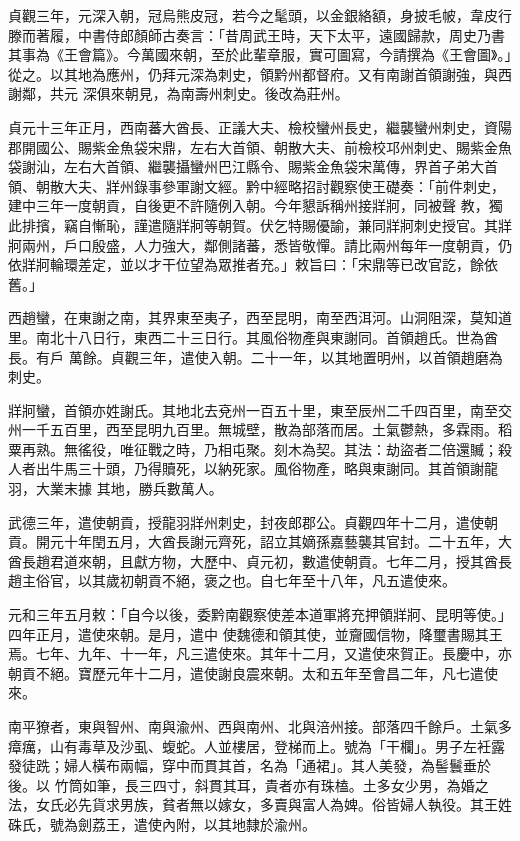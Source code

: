 \begin{pinyinscope}
 貞觀三年，元深入朝，冠烏熊皮冠，若今之髦頭，以金銀絡額，身披毛帔，韋皮行滕而著履，中書侍郎顏師古奏言：「昔周武王時，天下太平，遠國歸款，周史乃書其事為《王會篇》。今萬國來朝，至於此輩章服，實可圖寫，今請撰為《王會圖》。」從之。以其地為應州，仍拜元深為刺史，領黔州都督府。又有南謝首領謝強，與西謝鄰，共元
 深俱來朝見，為南壽州刺史。後改為莊州。



 貞元十三年正月，西南蕃大酋長、正議大夫、檢校蠻州長史，繼襲蠻州刺史，資陽郡開國公、賜紫金魚袋宋鼎，左右大首領、朝散大夫、前檢校邛州刺史、賜紫金魚袋謝汕，左右大首領、繼襲攝蠻州巴江縣令、賜紫金魚袋宋萬傳，界首子弟大首領、朝散大夫、牂州錄事參軍謝文經。黔中經略招討觀察使王礎奏：「前件刺史，建中三年一度朝貢，自後更不許隨例入朝。今年懇訴稱州接牂牁，同被聲
 教，獨此排擯，竊自慚恥，謹遣隨牂牁等朝賀。伏乞特賜優諭，兼同牂牁刺史授官。其牂牁兩州，戶口殷盛，人力強大，鄰側諸蕃，悉皆敬憚。請比兩州每年一度朝貢，仍依牂牁輪環差定，並以才干位望為眾推者充。」敕旨曰：「宋鼎等已改官訖，餘依舊。」



 西趙蠻，在東謝之南，其界東至夷子，西至昆明，南至西洱河。山洞阻深，莫知道里。南北十八日行，東西二十三日行。其風俗物產與東謝同。首領趙氏。世為酋長。有戶
 萬餘。貞觀三年，遣使入朝。二十一年，以其地置明州，以首領趙磨為刺史。



 牂牁蠻，首領亦姓謝氏。其地北去兗州一百五十里，東至辰州二千四百里，南至交州一千五百里，西至昆明九百里。無城壁，散為部落而居。土氣鬱熱，多霖雨。稻粟再熟。無徭役，唯征戰之時，乃相屯聚。刻木為契。其法：劫盜者二倍還贓；殺人者出牛馬三十頭，乃得贖死，以納死家。風俗物產，略與東謝同。其首領謝龍羽，大業末據
 其地，勝兵數萬人。



 武德三年，遣使朝貢，授龍羽牂州刺史，封夜郎郡公。貞觀四年十二月，遣使朝貢。開元十年閏五月，大酋長謝元齊死，詔立其嫡孫嘉藝襲其官封。二十五年，大酋長趙君道來朝，且獻方物，大歷中、貞元初，數遣使朝貢。七年二月，授其酋長趙主俗官，以其歲初朝貢不絕，褒之也。自七年至十八年，凡五遣使來。



 元和三年五月敕：「自今以後，委黔南觀察使差本道軍將充押領牂牁、昆明等使。」四年正月，遣使來朝。是月，遣中
 使魏德和領其使，並齎國信物，降璽書賜其王焉。七年、九年、十一年，凡三遣使來。其年十二月，又遣使來賀正。長慶中，亦朝貢不絕。寶歷元年十二月，遣使謝良震來朝。太和五年至會昌二年，凡七遣使來。



 南平獠者，東與智州、南與渝州、西與南州、北與涪州接。部落四千餘戶。土氣多瘴癘，山有毒草及沙虱、蝮蛇。人並樓居，登梯而上。號為「干欄」。男子左衽露發徒跣；婦人橫布兩幅，穿中而貫其首，名為「通裙」。其人美發，為髻鬟垂於後。以
 竹筒如筆，長三四寸，斜貫其耳，貴者亦有珠榼。土多女少男，為婚之法，女氏必先貨求男族，貧者無以嫁女，多賣與富人為婢。俗皆婦人執役。其王姓硃氏，號為劍荔王，遣使內附，以其地隸於渝州。




\end{pinyinscope}
